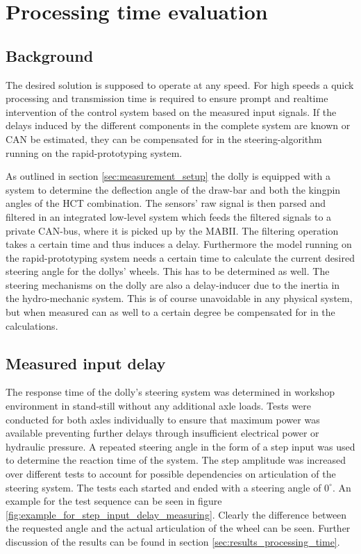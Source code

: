 \documentclass[ExampleMasters.tex]{subfiles}
\begin{document}
\section{Processing time evaluation}
\label{chap:processing_time_delay}
\subsection{Background}
The desired solution is supposed to operate at any speed. For high speeds a quick processing and transmission time is required to ensure prompt and realtime intervention of the control system based on the measured input signals. If the delays induced by the different components in the complete system are known or \gls{CAN} be estimated, they can be compensated for in the steering-algorithm running on the rapid-prototyping system.

As outlined in section \ref{sec:measurement_setup} the dolly is equipped with a system to determine the deflection angle of the draw-bar and both the kingpin angles of the \gls{HCT} combination. The sensors' raw signal is then parsed and filtered in an integrated low-level system which feeds the filtered signals to a private \gls{CAN}-bus, where it is picked up by the \gls{MABII}. The filtering operation takes a certain time and thus induces a delay. Furthermore the model running on the rapid-prototyping system needs a certain time to calculate the current desired steering angle for the dollys' wheels. This has to be determined as well. The steering mechanisms on the dolly are also a delay-inducer due to the inertia in the hydro-mechanic system. This is of course unavoidable in any physical system, but when measured can as well to a certain degree be compensated for in the calculations. 


\subsection{Measured input delay}
\label{sec:measuring_delay}

The response time of the dolly's steering system was determined in workshop environment in stand-still without any additional axle loads. Tests were conducted for both axles individually to ensure that maximum power was available preventing further delays through insufficient electrical power or hydraulic pressure. A repeated steering angle in the form of a step input was used to determine the reaction time of the system. The step amplitude was increased over different tests to account for possible dependencies on articulation of the steering system. The tests each started and ended with a steering angle of $0^\circ .$ An example for the test sequence can be seen in figure \ref{fig:example_for_step_input_delay_measuring}. Clearly the difference between the requested angle and the actual articulation of the wheel can be seen. Further discussion of the results can be found in section \ref{sec:results_processing_time}.\\
\end{document}
